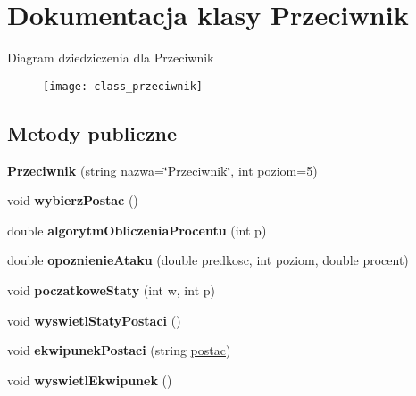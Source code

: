 \hypertarget{class_przeciwnik}{}\section{Dokumentacja klasy Przeciwnik}
\label{class_przeciwnik}
Diagram dziedziczenia dla Przeciwnik\begin{figure}[H]
\begin{center}
\leavevmode
\texttt{[image: class\_przeciwnik]}
\end{center}
\end{figure}
\subsection*{Metody publiczne}
\begin{DoxyCompactItemize}
\item 
{\bfseries Przeciwnik} (string nazwa=\char`\"{}Przeciwnik\char`\"{}, int poziom=5)\hypertarget{class_przeciwnik_a43091d28a1e7d139ebba933d94dbe59b}{}\label{class_przeciwnik_a43091d28a1e7d139ebba933d94dbe59b}

\item 
void {\bfseries wybierz\+Postac} ()\hypertarget{class_przeciwnik_a369acda4edc4173d1c58cd2aa55ec6cb}{}\label{class_przeciwnik_a369acda4edc4173d1c58cd2aa55ec6cb}

\item 
double {\bfseries algorytm\+Obliczenia\+Procentu} (int p)\hypertarget{class_przeciwnik_a64f579efdbd6bcabeaa88cb9cdcb1fe5}{}\label{class_przeciwnik_a64f579efdbd6bcabeaa88cb9cdcb1fe5}

\item 
double {\bfseries opoznienie\+Ataku} (double predkosc, int poziom, double procent)\hypertarget{class_przeciwnik_a01bd6be88bc9ef3752ffcc86a7d05e8d}{}\label{class_przeciwnik_a01bd6be88bc9ef3752ffcc86a7d05e8d}

\item 
void {\bfseries poczatkowe\+Staty} (int w, int p)\hypertarget{class_przeciwnik_ae81284629684beda35651b8622a9c9b0}{}\label{class_przeciwnik_ae81284629684beda35651b8622a9c9b0}

\item 
void {\bfseries wyswietl\+Staty\+Postaci} ()\hypertarget{class_przeciwnik_ab4b6ff29fd093dee4e61077865a2c8c7}{}\label{class_przeciwnik_ab4b6ff29fd093dee4e61077865a2c8c7}

\item 
void {\bfseries ekwipunek\+Postaci} (string \hyperlink{classpostac}{postac})\hypertarget{class_przeciwnik_a7ee1e71b9fd1b1101f6f3b0784ea74eb}{}\label{class_przeciwnik_a7ee1e71b9fd1b1101f6f3b0784ea74eb}

\item 
void {\bfseries wyswietl\+Ekwipunek} ()\hypertarget{class_przeciwnik_a2d14a358e48602b37c98af43b3c71c8f}{}\label{class_przeciwnik_a2d14a358e48602b37c98af43b3c71c8f}

\end{DoxyCompactItemize}

